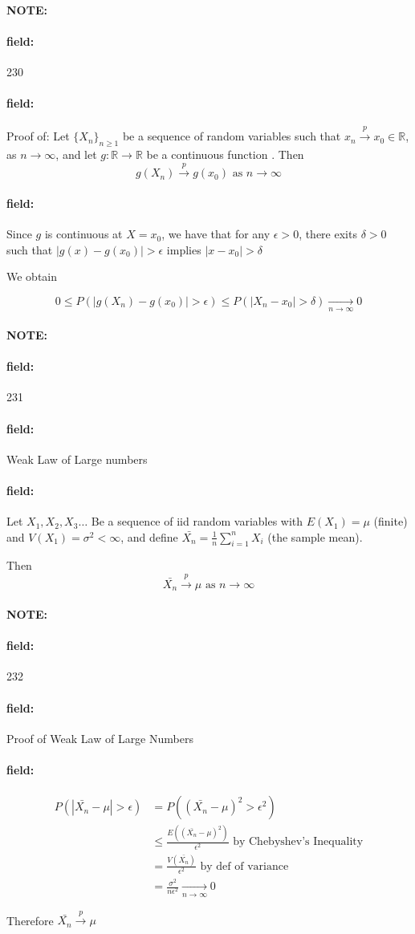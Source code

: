 \documentclass[12pt]{article}
\newenvironment{note}{\paragraph{NOTE:}}{}
\newenvironment{field}{\paragraph{field:}}{}
\begin{document}
\begin{note} \begin{field} \tiny 230 \end{field}
  \begin{field}
    Proof of: Let $\{X_n\}_{n \geq 1}$ be a sequence of random variables such that $x_n \overset{p}{\to} x_0 \in \mathbb{R}$, as $n \to \infty$, and let $g: \mathbb{R} \to \mathbb{R}$ be a continuous function . Then $$g(X_n) \overset{p}{\to} g(x_0) \text{ as } n \to \infty$$
  \end{field}
  \begin{field}
    Since $g$ is continuous at $X = x_0$, we have that for any $\epsilon > 0$, there exits $\delta > 0$ such that $|g(x) - g(x_0)| > \epsilon $ implies $|x - x_0| > \delta $

    We obtain

    $$0 \leq P(|g(X_n) - g(x_0)| > \epsilon ) \leq P(|X_n - x_0| > \delta) \underset{n \to \infty}{\to} 0$$
  \end{field}
\end{note}


\begin{note} \begin{field} \tiny 231 \end{field}
  \begin{field}
    Weak Law of Large numbers
  \end{field}
  \begin{field}
    Let $X_1, X_2, X_3 \ldots$ Be a sequence of iid random variables with $E(X_1) = \mu$ (finite) and $V(X_1) = \sigma^2 < \infty$, and define $\bar{X_n} = \frac{1}{n} \sum_{i = 1}^n X_i$ (the sample mean).

    Then $$ \bar{X_n }\overset{p}{\to}\mu \text{ as } n \to \infty$$

  \end{field}
\end{note}


\begin{note} \begin{field} \tiny 232 \end{field}
  \begin{field}
    Proof of Weak Law of Large Numbers
  \end{field}
  \begin{field}
    \begin{align*}
      P(|\bar{X_n} - \mu| > \epsilon ) &= P((\bar{X_n} - \mu)^2 > \epsilon^2)\\
      &\leq \frac{E((\bar{X_n} - \mu)^2)}{\epsilon^2} \text{ by Chebyshev's Inequality}\\
      &= \frac{V(\bar{X_n})}{\epsilon^2} \text{ by def of variance}\\
      &= \frac{\sigma^2}{n \epsilon^2} \underset{n \to \infty}{\to} 0
    \end{align*}

    Therefore $\bar{X_n} \overset{p}{\to} \mu$
  \end{field}
\end{note}
\end{document}
